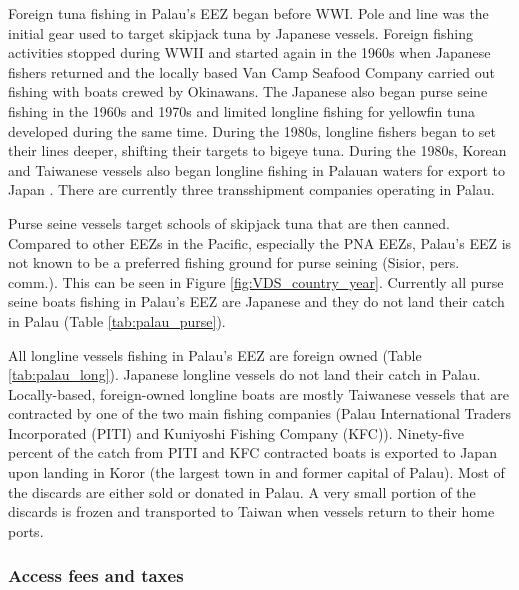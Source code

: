 \documentclass[9p,twocolumn,twoside,lineno]{pnas-new}
\begin{document}
Foreign tuna fishing in Palau’s EEZ began before WWI. Pole and line was the initial gear used to target skipjack tuna by Japanese vessels. Foreign fishing activities stopped during WWII and started again in the 1960s when Japanese fishers returned and the locally based Van Camp Seafood Company carried out fishing with boats crewed by Okinawans. The Japanese also began purse seine fishing in the 1960s and 1970s and limited longline fishing for yellowfin tuna developed during the same time. During the 1980s, longline fishers began to set their lines deeper, shifting their targets to bigeye tuna. During the 1980s, Korean and Taiwanese vessels also began longline fishing in Palauan waters for export to Japan \citep{chapman2000development}. There are currently three transshipment companies operating in Palau.

Purse seine vessels target schools of skipjack tuna that are then canned. Compared to other EEZs in the Pacific, especially the PNA EEZs, Palau’s EEZ is not known to be a preferred fishing ground for purse seining (Sisior, pers. comm.). This can be seen in Figure \ref{fig:VDS_country_year}. Currently all purse seine boats fishing in Palau’s EEZ are Japanese and they do not land their catch in Palau (Table \ref{tab:palau_purse}). 



All longline vessels fishing in Palau’s EEZ are foreign owned (Table \ref{tab:palau_long}). Japanese longline vessels do not land their catch in Palau. Locally-based, foreign-owned longline boats are mostly Taiwanese vessels that are contracted by one of the two main fishing companies (Palau International Traders Incorporated (PITI) and Kuniyoshi Fishing Company (KFC)). Ninety-five percent of the catch from PITI and KFC contracted boats is exported to Japan upon landing in Koror (the largest town in and former capital of Palau). Most of the discards are either sold or donated in Palau. A very small portion of the discards is frozen and transported to Taiwan when vessels return to their home ports.




\subsubsection{Access fees and taxes}
\end{document}
